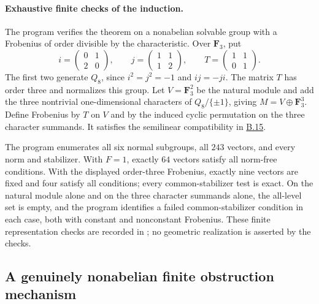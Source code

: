 \documentclass[11pt,a4paper]{article}
\newcommand{\statementref}[1]{\hyperlink{#1}{#1}}
\begin{document}
\paragraph{Exhaustive finite checks of the induction.}
The program  verifies the
theorem on a nonabelian solvable group with a Frobenius of order
divisible by the characteristic. Over $\mathbf F_3$, put
\[
 i=\begin{pmatrix}0&1\\2&0\end{pmatrix},\qquad
 j=\begin{pmatrix}1&1\\1&2\end{pmatrix},\qquad
 T=\begin{pmatrix}1&1\\0&1\end{pmatrix}.
\]
The first two generate $Q_8$, since $i^2=j^2=-1$ and
$ij=-ji$. The matrix $T$ has order three and normalizes this
group. Let $V=\mathbf F_3^2$ be the natural module and add
the three nontrivial one-dimensional characters of
$Q_8/\{\pm1\}$, giving $M=V\oplus\mathbf F_3^3$.
Define Frobenius by $T$ on $V$ and by the induced cyclic
permutation on the three character summands. It satisfies
the semilinear compatibility in \statementref{B.15}.

The program enumerates all six normal subgroups, all $243$
vectors, and every norm and stabilizer. With $F=1$, exactly
$64$ vectors satisfy all norm-free conditions. With the
displayed order-three Frobenius, exactly nine vectors are
fixed and four satisfy all conditions; every common-stabilizer
test is exact. On the natural module alone and on the three
character summands alone, the all-level set is empty, and
the program identifies a failed common-stabilizer condition
in each case, both with constant and nonconstant Frobenius.
These finite representation checks are recorded in
; no geometric
realization is asserted by the checks.


\subsection{A genuinely nonabelian finite obstruction mechanism}
\end{document}
